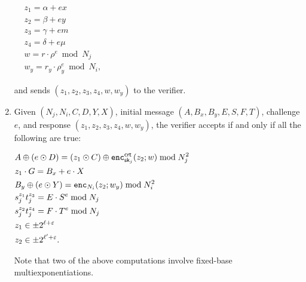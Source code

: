 \documentclass[11pt]{article}
\def\crt{{\sf crt}}
\newcommand{\enc}{\ensuremath{\mathtt{enc}}}
\newcommand{\sk}{\textsf{sk}}
\newcommand{\?}[1]{\stackrel{?}{#1}}
\begin{document}
\begin{enumerate}
    $\begin{aligned}
        & z_1 = \alpha + e x \\
        & z_2 = \beta + e y \\
        & z_3 = \gamma + e m \\ 
        & z_4 = \delta + e \mu \\
        & w = r \cdot \rho^e \bmod N_j \\
        & w_y = r_y \cdot \rho_y^e \bmod N_i,
    \end{aligned}$
    
    and sends $(z_1, z_2, z_3, z_4, w, w_y)$ to the verifier.

    \item Given $(N_j,N_i,C,D,Y,X)$, initial message $(A,B_x,B_y,E,S,F,T)$, challenge $e$, and response $(z_1, z_2, z_3, z_4, w, w_y)$, the verifier accepts if and only if all the following are true:
    
$\begin{aligned}
    &  A \oplus (e \odot D)  = (z_1 \odot C) \oplus \enc^\crt_{\sk_j}(z_2; w)\bmod N_j^2\\
    &  z_1 \cdot G = B_x + e \cdot X \\
    &  B_y \oplus (e \odot Y)  = \enc_{N_i}(z_2; w_y) \bmod N_i^2\\
    &  s_j^{z_1} t_j^{z_3} = E \cdot S^e \bmod N_j
                                            \\
    &  s_j^{z_2} t_j^{z_4} = F \cdot T^e \bmod N_j \\
    &  z_1 \in \pm 2^{\ell + \varepsilon} \\
    &  z_2 \in \pm 2^{\ell' + \varepsilon}.
    \end{aligned}$
    
Note that two of the above computations involve fixed-base multiexponentiations.
   
\end{enumerate}
\end{document}
